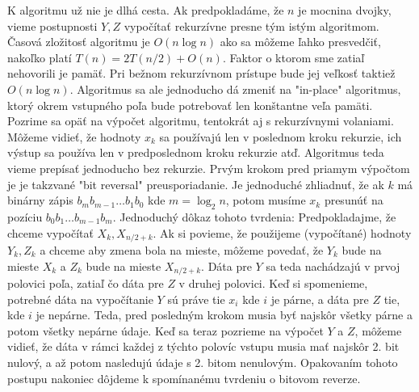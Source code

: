 K algoritmu už nie je dlhá cesta. Ak predpokladáme, že $n$ je mocnina
dvojky, vieme postupnosti $Y,Z$ vypočítať rekurzívne presne tým istým
algoritmom. Časová zložitosť algoritmu je $O(n\log n)$ ako sa môžeme
ľahko presvedčiť, nakoľko platí $T(n) = 2 T(n/2) + O(n)$.
Faktor o ktorom sme zatiaľ nehovorili je pamäť. Pri bežnom rekurzívnom
prístupe bude jej veľkosť taktiež $O(n \log n)$. Algoritmus sa ale
jednoducho dá zmeniť na "in-place" algoritmus, ktorý okrem vstupného
poľa bude potrebovať len konštantne veľa pamäti. Pozrime sa opäť na
výpočet algoritmu, tentokrát aj s rekurzívnymi volaniami.
Môžeme vidieť, že hodnoty $x_k$ sa používajú len v poslednom kroku
rekurzie, ich výstup sa používa len v predposlednom kroku rekurzie
atď. Algoritmus teda vieme prepísať jednoducho bez rekurzie.
Prvým krokom pred priamym výpočtom je je takzvané "bit reversal"
preusporiadanie. Je jednoduché zhliadnuť, že ak $k$ má binárny zápis
$b_m b_{m-1} \dots b_1 b_0$ kde $m = \log_2 n$, potom musíme
$x_k$ presunúť na pozíciu $b_0 b_1 \dots b_{m-1} b_m$. Jednoduchý
dôkaz tohoto tvrdenia: 
Predpokladajme, že chceme vypočítať $X_k, X_{n/2+k}$. Ak si povieme,
že použijeme (vypočítané) hodnoty $Y_k, Z_k$ a chceme aby zmena bola
na mieste, môžeme povedať, že $Y_k$ bude na mieste $X_k$ a $Z_k$ bude
na mieste $X_{n/2+k}$. Dáta pre $Y$ sa teda nachádzajú v prvoj
polovici poľa, zatiaľ čo dáta pre $Z$ v druhej polovici.
Keď si spomenieme, potrebné dáta na vypočítanie $Y$ sú práve tie $x_i$ kde $i$ je párne,
a dáta pre $Z$ tie, kde $i$ je nepárne. Teda, pred posledným krokom
musia byť najskôr všetky párne a potom všetky nepárne údaje. Keď sa
teraz pozrieme na výpočet $Y$ a $Z$, môžeme vidieť, že dáta v rámci
každej z týchto polovíc vstupu musia mať najskôr 2. bit nulový, a až
potom nasledujú údaje s 2. bitom nenulovým. Opakovaním tohoto postupu
nakoniec dôjdeme k spomínanému tvrdeniu o bitovom reverze.
